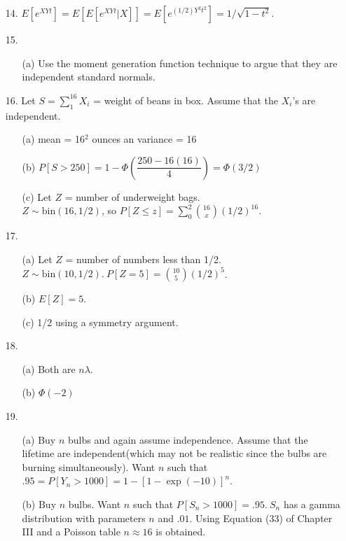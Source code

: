\begin{enumerate}
	\item[14.] $E[e^{XYt}] = E[E[e^{XYt}\vert X]] = E[e^{(1/2)Y^2t^2}] = 1/\sqrt{1-t^2}$.
	
	\item[15.] \begin{itemize}
		\item[(a)] Use the moment generation function technique to argue that they are independent standard normals.
	\end{itemize}
	
	\item[16.] Let $\displaystyle S = \sum_{1}^{16}X_i$ = weight of beans in box. Assume that the $X_i$'s are independent. 
	\begin{enumerate}
		\item[(a)] mean = 16$^2$ ounces an variance = 16
		\item[(b)] $P[S> 250] = 1-\Phi\left(\dfrac{250-16(16)}{4}\right) = \Phi(3/2)$
		\item[(c)] Let $Z$ = number of underweight bags. \\
					$Z\sim \mbox{bin}(16,1/2)$, so $P[Z\le z] = \displaystyle\sum_{0}^{2}{16\choose x}(1/2)^{16}$. 
	\end{enumerate}
	
	\item[17.] \begin{enumerate}
		\item[(a)] Let $Z$ = number of numbers less than 1/2. $Z\sim\mbox{bin}(10,1/2).\ P[Z=5]=\displaystyle{10\choose 5}(1/2)^5$.
		\item[(b)] $E[Z]=5$.
		\item[(c)] 1/2 using a symmetry argument.
	\end{enumerate}
	
	\newpage
	
	\item[18.] \begin{enumerate}
		\item[(a)] Both are $n\lambda$.
		\item[(b)] $\Phi(-2)$
	\end{enumerate}

	\item[19.]  \begin{enumerate}
		\item[(a)] Buy $n$ bulbs and again assume independence. Assume that the lifetime are independent(which may not be realistic since the bulbs are burning simultaneously).  Want $n$ such that $.95=P[Y_n> 1000]=1-[1-\exp(-10)]^n$.
		\item[(b)] Buy $n$ bulbs.  Want $n$ such that $P[S_n> 1000]=.95.\ S_n$ has a gamma distribution with parameters $n$ and $.01$.  Using Equation (33) of Chapter III and a Poisson table $n\approx 16$ is obtained.
	\end{enumerate}


\end{enumerate}
